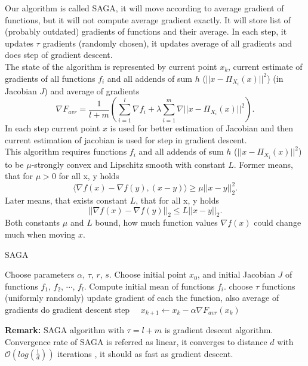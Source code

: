 \documentclass[11pt]{book}
\begin{document}
Our algorithm is called SAGA, it will move according to average gradient of functions, but it will not compute average gradient exactly. It will store list of (probably outdated) gradients of functions and their average. In each step, it updates $\tau$ gradients (randomly chosen), it updates average of all gradients and does step of gradient descent.\\

The state of the algorithm is represented by current point $x_k$, current estimate of gradients of all functions $f_i$ and all addends of sum $h$ ($||x-\Pi_{X_i}(x)||^2$) (in Jacobian $J$) and average of gradients $$\nabla F_{avr}= \frac{1}{l+m}\left( \sum_{i=1}^l \nabla f_i + \lambda\sum_{i=1}^m \nabla ||x-\Pi_{X_i}(x)||^2 \right).$$ In each step current point $x$ is used for better estimation of Jacobian and then current estimation of jacobian is used for step in gradient descent.\\

This algorithm requires functions $f_i$ and all addends of sum $h$ ($||x-\Pi_{X_i}(x)||^2$) to be $\mu$-strongly convex and Lipschitz smooth with constant $L$. Former means, that for $\mu>0$ for all x, y holds $$\langle \nabla f(x) - \nabla f(y), (x-y) \rangle \geq \mu ||x-y||_2^2. $$
Later means, that exists constant $L$, that for all x, y holds $$||\nabla f(x) - \nabla f(y)||_2 \leq L ||x-y||_2.$$ Both constants $\mu$ and $L$ bound, how much function values $\nabla f(x)$ could change much when moving $x$.

\begin{algorithm}[H]
	\caption{SAGA \cite{SAGA}}
	\label{alg:saga}
	\begin{algorithmic}[1]
		\State Choose parameters $\alpha$, $\tau$, $r$, $s$.
		\State Choose initial point $x_0$, and initial Jacobian $J$ of functions $f_1$, $f_2$, $\cdots$, $f_l$.
		\State Compute initial mean of functions $f_i$.
		\State choose $\tau$ functions (uniformly randomly)
		\State update gradient of each the function, also average of gradients
		\State do gradient descent step $\quad x_{k+1} \leftarrow x_k - \alpha\nabla F_{avr}(x_k) \quad$
		\EndFor
	\end{algorithmic}
\end{algorithm}

\textbf{Remark:} SAGA algorithm with $\tau=l+m$ is gradient descent algorithm.\\

Convergence rate of SAGA is referred as linear, it converges to distance $d$ with $\mathcal{O}(log(\frac{1}{d}))$ iterations \cite{SAGA}, it should as fast as gradient descent.\\
\end{document}
